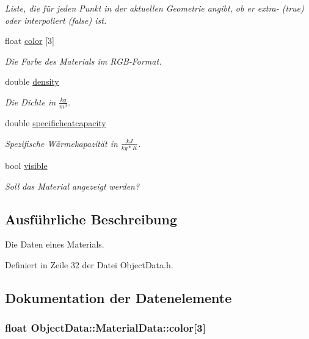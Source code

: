 \begin{DoxyCompactItemize}
\begin{DoxyCompactList}\small\item\em Liste, die für jeden Punkt in der aktuellen Geometrie angibt, ob er extra-\/ (true) oder interpoliert (false) ist. \end{DoxyCompactList}\item 
float \hyperlink{structObjectData_1_1MaterialData_a3930f8e673d50b88c9234c7f73c16a91}{color} \mbox{[}3\mbox{]}
\begin{DoxyCompactList}\small\item\em Die Farbe des Materials im R\-G\-B-\/\-Format. \end{DoxyCompactList}\item 
double \hyperlink{structObjectData_1_1MaterialData_a49cbca11f42993f41497e725fe8ca68c}{density}
\begin{DoxyCompactList}\small\item\em Die Dichte in $\frac{kg}{m^3}$. \end{DoxyCompactList}\item 
double \hyperlink{structObjectData_1_1MaterialData_a784e2b70f98d146979fd422d41445fea}{specificheatcapacity}
\begin{DoxyCompactList}\small\item\em Spezifische Wärmekapazität in $\frac{kJ}{kg*K}$. \end{DoxyCompactList}\item 
bool \hyperlink{structObjectData_1_1MaterialData_a37980da11f6b51b30eb41c3ab4e9674a}{visible}
\begin{DoxyCompactList}\small\item\em Soll das Material angezeigt werden? \end{DoxyCompactList}\end{DoxyCompactItemize}


\subsection{Ausführliche Beschreibung}
Die Daten eines Materials. 

Definiert in Zeile 32 der Datei Object\-Data.\-h.



\subsection{Dokumentation der Datenelemente}
\hypertarget{structObjectData_1_1MaterialData_a3930f8e673d50b88c9234c7f73c16a91}{
\subsubsection[{color}]{\setlength{\rightskip}{0pt plus 5cm}float Object\-Data\-::\-Material\-Data\-::color\mbox{[}3\mbox{]}}}\label{structObjectData_1_1MaterialData_a3930f8e673d50b88c9234c7f73c16a91}


